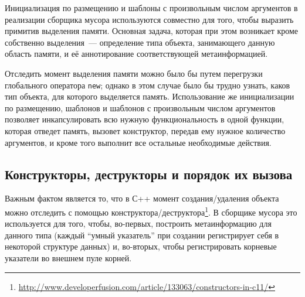 Инициализация по размещению и шаблоны с произвольным числом аргументов в реализации сборщика мусора используются 
совместно для того, чтобы выразить примитив выделения памяти. Основная задача, которая при этом возникает 
кроме собственно выделения~--- определение типа объекта, занимающего данную область памяти, и её аннотирование
соответствующей метаинформацией. 

Отследить момент выделения памяти можно было бы путем перегрузки глобального оператора \lstinline{new}; однако
в этом случае было бы трудно узнать, каков тип объекта, для которого выделяется память. Использование же
инициализации по размещению, шаблонов и шаблонов с произвольным числом аргументов позволяет инкапсулировать
всю нужную функциональность в одной функции, которая отведет память, вызовет конструктор, передав
ему нужное количество аргументов, и кроме того выполнит все остальные необходимые действия.

 \subsection{Конструкторы, деструкторы и порядок их вызова} 

Важным фактом является то, что в С++ момент создания/удаления объекта можно отследить с помощью 
конструктора/деструктора\footnote{\url{http://www.developerfusion.com/article/133063/constructors-in-c11/}}. 
В сборщике мусора это используется для того, чтобы, во-первых, построить метаинформацию для данного типа (каждый
``умный указатель'' при создании регистрирует себя в некоторой структуре данных) и, во-вторых, чтобы регистрировать
корневые указатели во внешнем пуле корней.
